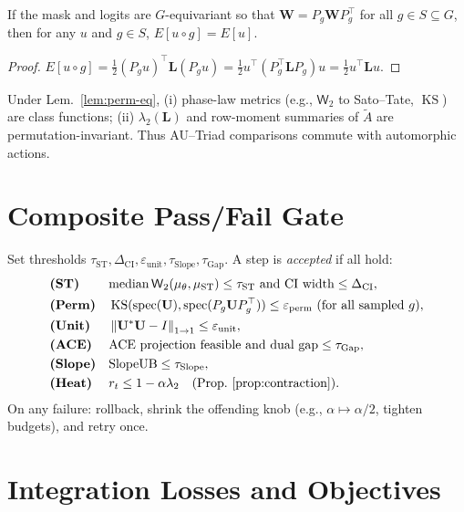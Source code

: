 \documentclass[11pt]{article}
\newcommand{\Id}{I}
\newcommand{\norm}[1]{\left\lVert #1 \right\rVert}
\newcommand{\KS}{\operatorname{KS}}
\newcommand{\W}{\mathsf{W}}
\newcommand{\bU}{\mathbf{U}}
\newcommand{\bL}{\mathbf{L}}
\newcommand{\bW}{\mathbf{W}}
\newcommand{\spec}{\operatorname{spec}}
\begin{document}
\begin{prop}\label{prop:energy-inv}
If the mask and logits are $G$-equivariant so that $\bW=P_g \bW P_g^\top$ for all $g\in S\subseteq G$, then for any $u$ and $g\in S$,
\(
E[u\circ g] = E[u].
\)
\end{prop}
\begin{proof}
$E[u\circ g]=\tfrac12 (P_g u)^\top \bL (P_g u)=\tfrac12 u^\top (P_g^\top \bL P_g) u= \tfrac12 u^\top \bL u$.
\end{proof}

\begin{prop}\label{prop:metrics}
Under Lem.~\ref{lem:perm-eq}, (i) phase-law metrics (e.g., $\W_2$ to Sato--Tate, $\KS$) are class functions; (ii) $\lambda_2(\bL)$ and row-moment summaries of $\tilde A$ are permutation-invariant. Thus AU--Triad comparisons commute with automorphic actions.
\end{prop}

\section{Composite Pass/Fail Gate}
Set thresholds $\tau_{\mathrm{ST}}, \Delta_{\mathrm{CI}}, \varepsilon_{\mathrm{unit}}, \tau_{\mathrm{Slope}}, \tau_{\mathrm{Gap}}$.
A step is \emph{accepted} if all hold:
\begin{align*}
&\textbf{(ST)} && \mathrm{median}\,\W_2(\mu_\theta,\mu_{\mathrm{ST}})\le \tau_{\mathrm{ST}} \ \text{and CI width}\le \Delta_{\mathrm{CI}},\\
&\textbf{(Perm)} && \KS(\spec(\bU),\spec(P_g \bU P_g^\top)) \le \varepsilon_{\mathrm{perm}} \ \text{(for all sampled $g$)},\\
&\textbf{(Unit)} && \norm{\bU^*\bU-\Id}_{1\to 1} \le \varepsilon_{\mathrm{unit}},\\
&\textbf{(ACE)} && \text{ACE projection feasible and dual gap}\le \tau_{\mathrm{Gap}},\\
&\textbf{(Slope)} && \mathrm{SlopeUB}\le \tau_{\mathrm{Slope}},\\
&\textbf{(Heat)} && r_t \le 1-\alpha \lambda_2 \quad\text{(Prop.~\ref{prop:contraction}).}
\end{align*}
On any failure: rollback, shrink the offending knob (e.g., $\alpha\mapsto \alpha/2$, tighten budgets), and retry once.

\section{Integration Losses and Objectives}
\end{document}

